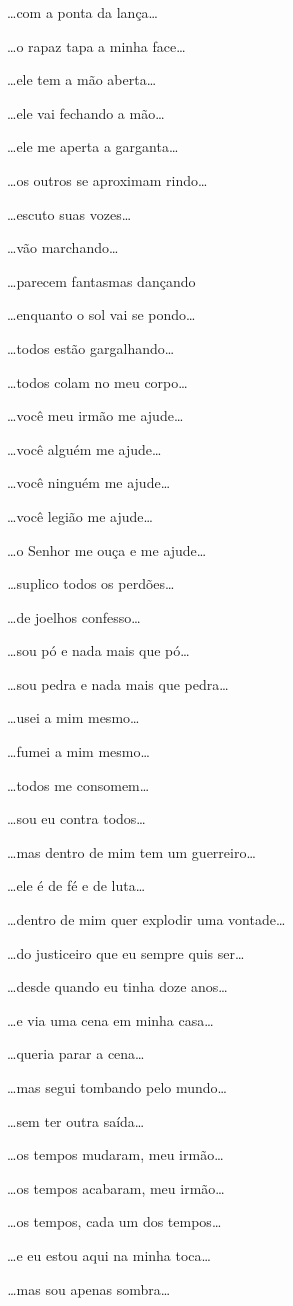 …com a ponta da lança…

…o rapaz tapa a minha face…

…ele tem a mão aberta…

…ele vai fechando a mão…

…ele me aperta a garganta…

…os outros se aproximam rindo…

…escuto suas vozes…

…vão marchando…

…parecem fantasmas dançando

…enquanto o sol vai se pondo…

…todos estão gargalhando…

…todos colam no meu corpo…

…você meu irmão me ajude…

…você alguém me ajude…

…você ninguém me ajude…

…você legião me ajude…

…o Senhor me ouça e me ajude…

\emph{…}suplico todos os perdões…

…de joelhos confesso…

…sou pó e nada mais que pó…

…sou pedra e nada mais que pedra…

…usei a mim mesmo…

…fumei a mim mesmo…

…todos me consomem…

…sou eu contra todos…

…mas dentro de mim tem um guerreiro…

…ele é de fé e de luta…

…dentro de mim quer explodir uma vontade…

…do justiceiro que eu sempre quis ser…

…desde quando eu tinha doze anos…

…e via uma cena em minha casa…

…queria parar a cena…

…mas segui tombando pelo mundo…

…sem ter outra saída…

…os tempos mudaram, meu irmão…

…os tempos acabaram, meu irmão…

…os tempos, cada um dos tempos…

…e eu estou aqui na minha toca…

\emph{…}mas sou apenas sombra…


